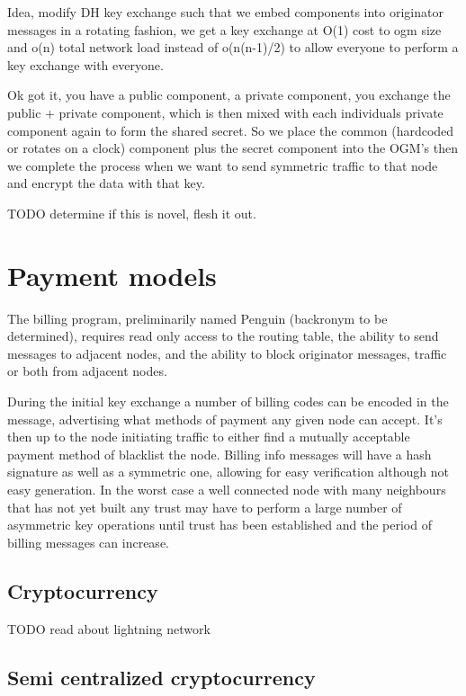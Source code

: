 \documentclass[11pt]{article}
\begin{document}
    Idea, modify DH key exchange such that we embed components into originator messages in a rotating fashion, we get a key exchange at O(1) cost to ogm size and o(n) total network load instead of o(n(n-1)/2) to allow everyone to perform a key exchange with everyone.
                
                Ok got it, you have a public component, a private component, you exchange the public + private component, which is then mixed with each individuals private component again to form the shared secret. So we place the common (hardcoded or rotates on a clock) component plus the secret component into the OGM's then we complete the process when we want to send symmetric traffic to that node and encrypt the data with that key.
                
                TODO determine if this is novel, flesh it out. 
                
\section{Payment models} \label{pay}

    The billing program, preliminarily named Penguin (backronym to be determined), requires read only access to the routing table, the ability to send messages to adjacent nodes, and the ability to block originator messages, traffic or both from adjacent nodes.
    
    During the initial key exchange a number of billing codes can be encoded in the message, advertising what methods of payment any given node can accept. It's then up to the node initiating traffic to either find a mutually acceptable payment method of blacklist the node. Billing info messages will have a hash signature as well as a symmetric one, allowing for easy verification although not easy generation. In the worst case a well connected node with many neighbours that has not yet built any trust may have to perform a large number of asymmetric key operations until trust has been established and the period of billing messages can increase.

    \subsection{Cryptocurrency}
    
          TODO read about lightning network
    
    \subsection{Semi centralized cryptocurrency}
\end{document}
